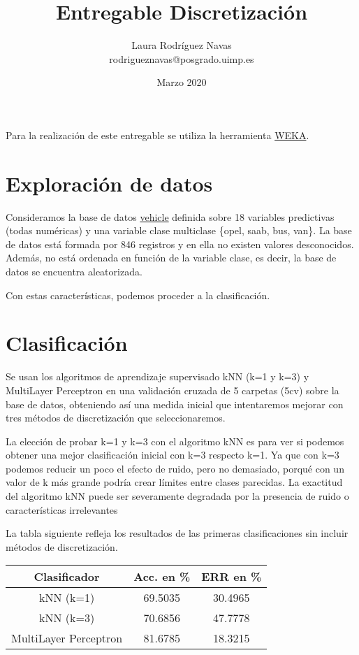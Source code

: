 \documentclass{article}
\title{Entregable Discretización}
\author{Laura Rodríguez Navas \\ rodrigueznavas@posgrado.uimp.es}
\date{Marzo 2020}
\begin{document}
	
\maketitle

Para la realización de este entregable se utiliza la herramienta \href{https://www.cs.waikato.ac.nz/ml/weka/}{WEKA}.

\section*{Exploración de datos}

Consideramos la base de datos \href{https://archive.ics.uci.edu/ml/datasets/Statlog+(Vehicle+Silhouettes)}{vehicle} definida sobre 18 variables predictivas (todas numéricas) y una variable clase multiclase \{opel, saab, bus, van\}. La base de datos está formada por 846 registros y en ella no existen valores desconocidos. Además, no está ordenada en función de la variable clase, es decir, la base de datos se encuentra aleatorizada. 

Con estas características, podemos proceder a la clasificación.

\section*{Clasificación}

Se usan los algoritmos de aprendizaje supervisado kNN (k=1 y k=3) y MultiLayer Perceptron en una validación cruzada de 5 carpetas (5cv) sobre la base de datos, obteniendo así una medida inicial que intentaremos mejorar con tres métodos de discretización que seleccionaremos. 

La elección de probar k=1 y k=3 con el algoritmo kNN es para ver si podemos obtener una mejor clasificación inicial con k=3 respecto k=1. Ya que con k=3 podemos reducir un poco el efecto de ruido, pero no demasiado, porqué con un valor de k más grande podría crear límites entre clases parecidas. La exactitud del algoritmo kNN puede ser severamente degradada por la presencia de ruido o características irrelevantes

La tabla siguiente refleja los resultados de las primeras clasificaciones sin incluir métodos de discretización.

\begin{center}
	\begin{tabular}{ |c|c|c| } 
		\hline
		Clasificador & Acc. en \% & ERR en \% \\
		\hline
		kNN (k=1) & 69.5035 & 30.4965 \\ 
		kNN (k=3) & 70.6856 & 47.7778 \\ 
		MultiLayer Perceptron & 81.6785 & 18.3215 \\ 
		\hline
	\end{tabular}
\end{center}
\end{document}
